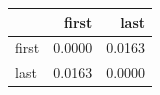 \begin{tabular}{lrr}
\toprule
 & first & last \\
\midrule
first & 0.0000 & 0.0163 \\
last & 0.0163 & 0.0000 \\
\bottomrule
\end{tabular}
